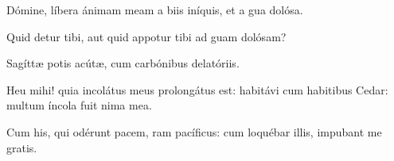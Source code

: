 \item {}

\item Dómine, líbera ánimam meam a biis iníquis,\psstar{} et a gua dolósa.

\item Quid detur tibi, aut quid appotur tibi\psstar{} ad guam dolósam?

\item Sagíttæ potis acútæ,\psstar{} cum carbónibus delatóriis.

\item Heu mihi! quia incolátus meus prolongátus est: habitávi cum habitibus Cedar:\psstar{} multum íncola fuit nima mea.

\item Cum his, qui odérunt pacem, ram pacíficus:\psstar{} cum loquébar illis, impubant me gratis.